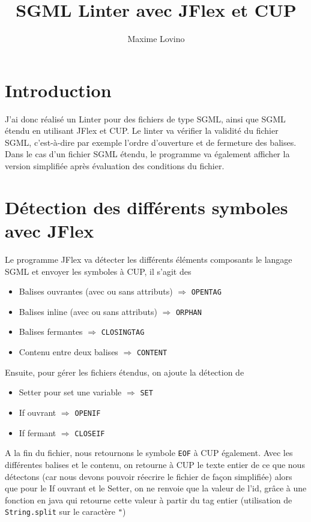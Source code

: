 \documentclass[a4paper]{article}
\title{SGML Linter avec JFlex et CUP}
\author{Maxime Lovino}
\begin{document}
\maketitle
\newpage
\section{Introduction}
J'ai donc réalisé un Linter pour des fichiers de type SGML, ainsi que SGML étendu en utilisant JFlex et CUP. Le linter va vérifier la validité du fichier SGML, c'est-à-dire par exemple l'ordre d'ouverture et de fermeture des balises. Dans le cas d'un fichier SGML étendu, le programme va également afficher la version simplifiée après évaluation des conditions du fichier.
\section{Détection des différents symboles avec JFlex}
Le programme JFlex va détecter les différents éléments composants le langage SGML et envoyer les symboles à CUP, il s'agit des
\begin{itemize}
	\item Balises ouvrantes (avec ou sans attributs) $\Rightarrow$ \verb+OPENTAG+
	\item Balises inline (avec ou sans attributs) $\Rightarrow$ \verb+ORPHAN+
	\item Balises fermantes $\Rightarrow$ \verb+CLOSINGTAG+
	\item Contenu entre deux balises $\Rightarrow$ \verb+CONTENT+
\end{itemize}
Ensuite, pour gérer les fichiers étendus, on ajoute la détection de
\begin{itemize}
	\item Setter pour set une variable $\Rightarrow$ \verb+SET+
	\item If ouvrant $\Rightarrow$ \verb+OPENIF+
	\item If fermant $\Rightarrow$ \verb+CLOSEIF+
\end{itemize}
A la fin du fichier, nous retournons le symbole \verb+EOF+ à CUP également. Avec les différentes balises et le contenu, on retourne à CUP le texte entier de ce que nous détectons (car nous devons pouvoir réecrire le fichier de façon simplifiée) alors que pour le If ouvrant et le Setter, on ne renvoie que la valeur de l'id, grâce à une fonction en java qui retourne cette valeur à partir du tag entier (utilisation de \verb+String.split+ sur le caractère \verb+"+) 
\end{document}
